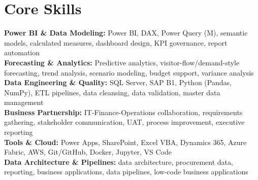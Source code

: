 \documentclass[10.5pt,letterpaper]{article}
\begin{document}
\section{Core Skills}
\noindent
\textbf{Power BI \& Data Modeling:} Power BI, DAX, Power Query (M), semantic models, calculated measures, dashboard design, KPI governance, report automation\\\textbf{Forecasting \& Analytics:} Predictive analytics, visitor-flow/demand-style forecasting, trend analysis, scenario modeling, budget support, variance analysis\\\textbf{Data Engineering \& Quality:} SQL Server, SAP B1, Python (Pandas, NumPy), ETL pipelines, data cleansing, data validation, master data management\\\textbf{Business Partnership:} IT-Finance-Operations collaboration, requirements gathering, stakeholder communication, UAT, process improvement, executive reporting\\\textbf{Tools \& Cloud:} Power Apps, SharePoint, Excel VBA, Dynamics 365, Azure Fabric, AWS, Git/GitHub, Docker, Jupyter, VS Code\\\textbf{Data Architecture \& Pipelines:} data architecture, procurement data, reporting, business applications, data pipelines, low-code business applications
\end{document}
